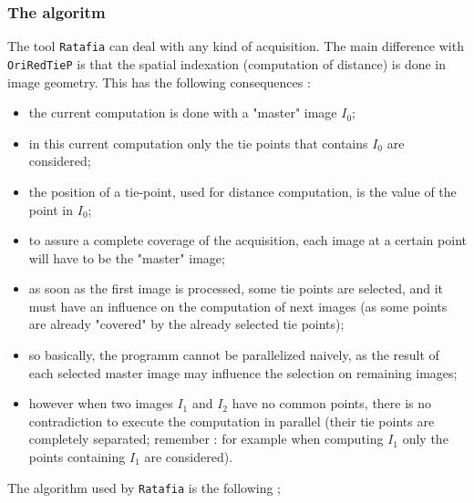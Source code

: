 \subsubsection{The algoritm}

The tool {\tt Ratafia} can deal with any kind of acquisition. The main difference with
{\tt OriRedTieP} is that the spatial indexation (computation of distance) is done in image geometry.
This has the following consequences :

\begin{itemize}
   \item the current computation  is done with a "master" image $I_0$;

   \item in this current computation  only the tie points that contains $I_0$ are considered;

   \item the position of a tie-point, used for distance computation, is the value of the point in $I_0$;

   \item to assure a complete coverage of the acquisition, each image at a certain point  will have to be the "master" image;

   \item as soon as the first image is processed,  some tie points are selected, and it must have an influence on 
         the computation of next images (as some points are already "covered" by the already selected tie points);

   \item so basically, the programm cannot be parallelized naively, as the result of each selected master
         image may influence the selection on remaining images;

   \item however when two images $I_1$ and $I_2$ have no common points, there is no contradiction to execute the computation
         in parallel  (their tie points are completely separated; remember : for example when computing $I_1$ only the points 
         containing $I_1$ are considered).
\end{itemize}

The algorithm used by  {\tt Ratafia}  is the following ;

